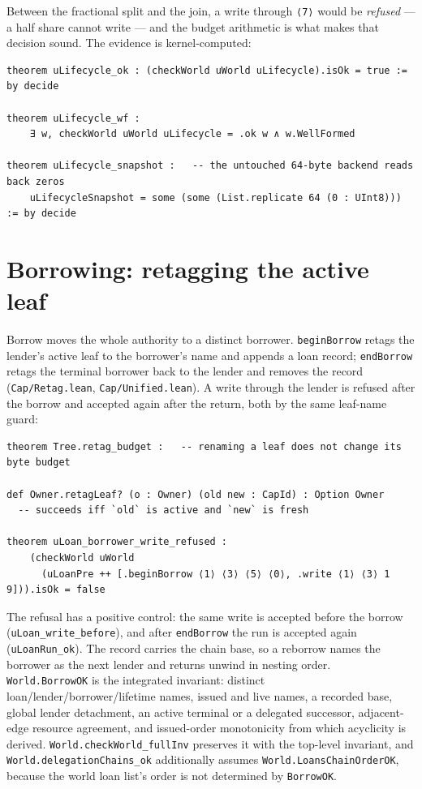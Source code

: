 \documentclass[10pt,a4paper]{article}
\newcommand{\file}[1]{\texttt{#1}}
\newcommand{\lean}[1]{\texttt{#1}}
\begin{document}
Between the fractional split and the join, a write through \lean{⟨7⟩} would be
\emph{refused} --- a half share cannot write --- and the budget arithmetic is
what makes that decision sound. The evidence is kernel-computed:

\begin{lstlisting}
theorem uLifecycle_ok : (checkWorld uWorld uLifecycle).isOk = true := by decide

theorem uLifecycle_wf :
    ∃ w, checkWorld uWorld uLifecycle = .ok w ∧ w.WellFormed

theorem uLifecycle_snapshot :   -- the untouched 64-byte backend reads back zeros
    uLifecycleSnapshot = some (some (List.replicate 64 (0 : UInt8))) := by decide
\end{lstlisting}

\section{Borrowing: retagging the active leaf}

Borrow moves the whole authority to a distinct borrower. \lean{beginBorrow}
retags the lender's active leaf to the borrower's name and appends a loan
record; \lean{endBorrow} retags the terminal borrower back to the lender and
removes the record (\file{Cap/Retag.lean}, \file{Cap/Unified.lean}). A write
through the lender is refused after the borrow and accepted again after the
return, both by the same leaf-name guard:

\begin{lstlisting}
theorem Tree.retag_budget :   -- renaming a leaf does not change its byte budget

def Owner.retagLeaf? (o : Owner) (old new : CapId) : Option Owner
  -- succeeds iff `old` is active and `new` is fresh

theorem uLoan_borrower_write_refused :
    (checkWorld uWorld
      (uLoanPre ++ [.beginBorrow ⟨1⟩ ⟨3⟩ ⟨5⟩ ⟨0⟩, .write ⟨1⟩ ⟨3⟩ 1 9])).isOk = false
\end{lstlisting}

The refusal has a positive control: the same write is accepted before the
borrow (\lean{uLoan\_write\_before}), and after \lean{endBorrow} the run is
accepted again (\lean{uLoanRun\_ok}). The record carries the chain base, so a
reborrow names the borrower as the next lender and returns unwind in nesting
order. \lean{World.BorrowOK} is the integrated invariant: distinct
loan/lender/borrower/lifetime names, issued and live names, a recorded base,
global lender detachment, an active terminal or a delegated successor,
adjacent-edge resource agreement, and issued-order monotonicity from which
acyclicity is derived. \lean{World.checkWorld\_fullInv} preserves it with the
top-level invariant, and \lean{World.delegationChains\_ok} additionally assumes
\lean{World.LoansChainOrderOK}, because the world loan list's order is not
determined by \lean{BorrowOK}.
\end{document}
